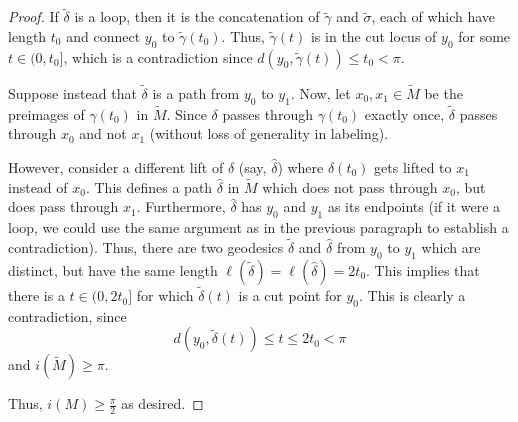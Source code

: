 \documentclass[fontsize=11pt]{scrartcl} %
\numberwithin{equation}{section} %
\numberwithin{figure}{section} %
\numberwithin{table}{section} %
\begin{document}
\begin{proof}
    If $\tilde{\delta}$ is a loop, then it is the concatenation of
    $\tilde{\gamma}$ and $\tilde{\sigma}$, each of which have length $t_0$ and
    connect $y_0$ to $\tilde{\gamma}(t_0)$. Thus, $\tilde{\gamma}(t)$ is in
    the cut locus of $y_0$ for some $t\in (0,t_0]$, which is a contradiction
    since $d(y_0,\tilde{\gamma}(t))\leq t_0<\pi$.

    Suppose instead that $\tilde{\delta}$ is a path from $y_0$ to $y_1$. Now,
    let $x_0,x_1\in \tilde{M}$ be the preimages of $\gamma(t_0)$ in
    $\tilde{M}$. Since $\delta$ passes through $\gamma(t_0)$ exactly once,
    $\tilde{\delta}$ passes through $x_0$ and not $x_1$ (without loss of
    generality in labeling).

    However, consider a different lift of $\delta$ (say, $\hat{\delta}$) where
    $\delta(t_0)$ gets lifted to $x_1$ instead of $x_0$. This defines a path
    $\hat{\delta}$ in $\tilde{M}$ which does not pass through $x_0$, but does
    pass through $x_1$. Furthermore, $\hat{\delta}$ has $y_0$ and $y_1$ as its
    endpoints (if it were a loop, we could use the same argument as in the
    previous paragraph to establish a contradiction). Thus, there are two
    geodesics $\tilde{\delta}$ and $\hat{\delta}$ from $y_0$ to $y_1$ which are
    distinct, but have the same length $\ell(\tilde{\delta}) =
    \ell(\hat{\delta}) = 2t_0$. This implies that there is a $t\in (0,2t_0]$ for
    which $\tilde{\delta}(t)$ is a cut point for $y_0$. This is clearly a
    contradiction, since
    \[
        d(y_0,\tilde{\delta}(t))\leq t \leq 2t_0<\pi
    \]
    and $i(\tilde{M})\geq \pi$.

    Thus, $i(M)\geq \frac{\pi}{2}$ as desired.
\end{proof}
\end{document}
